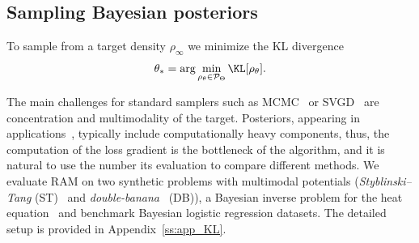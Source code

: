 \documentclass{article} %
\numberwithin{equation}{subsection}
\numberwithin{theorem}{section}
\newcommand{\PWspace}{\mathcal{P}_\Theta}
\begin{document}
    \subsection{Sampling Bayesian posteriors}\label{ss:sampling}

        To sample from a target density \(\rho_\infty\) we minimize the KL divergence 
        \begin{equation}
            \theta_*=\arg\min_{\rho_\theta\in\PWspace}\KL[\rho_\theta].
        \end{equation}

        The main challenges for standard samplers such as MCMC~\cite{hastings1970monte} or SVGD~\cite{liu2016stein} are  concentration and multimodality of the target.
        Posteriors, appearing in applications~\cite{dinkel2024solving,dashti2017bayesian}, typically include computationally heavy components, thus, the computation of the loss gradient is the bottleneck of the algorithm, and it is natural to use the number its evaluation to compare different methods.
        We evaluate RAM on two synthetic problems with multimodal potentials (\emph{Styblinski--Tang} (ST)~\cite{styblinski1990experiments}  and \emph{double-banana}~\cite{detommaso2018stein} (DB)), a Bayesian inverse problem for the heat equation~\cite{roberts2026propagating} and benchmark Bayesian logistic regression datasets.
        The detailed setup is provided in Appendix~\ref{ss:app_KL}.
\end{document}

